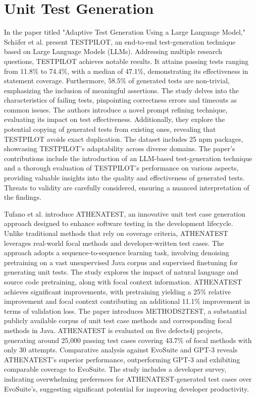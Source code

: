 \section{Unit Test Generation}
\label{sec:soa_unit_test_generation}
\vspace{0.2 cm}

In the paper titled "Adaptive Test Generation Using a Large Language Model," Schäfer et al. present TESTPILOT\cite{schafer_adaptive_2023}, an end-to-end test-generation technique based on Large Language Models (LLMs). Addressing multiple research questions, TESTPILOT achieves notable results. It attains passing tests ranging from 11.8\% to 74.4\%, with a median of 47.1\%, demonstrating its effectiveness in statement coverage. Furthermore, 58.5\% of generated tests are non-trivial, emphasizing the inclusion of meaningful assertions. The study delves into the characteristics of failing tests, pinpointing correctness errors and timeouts as common issues. The authors introduce a novel prompt refining technique, evaluating its impact on test effectiveness. Additionally, they explore the potential copying of generated tests from existing ones, revealing that TESTPILOT avoids exact duplication. The dataset includes 25 npm packages, showcasing TESTPILOT's adaptability across diverse domains. The paper's contributions include the introduction of an LLM-based test-generation technique and a thorough evaluation of TESTPILOT's performance on various aspects, providing valuable insights into the quality and effectiveness of generated tests. Threats to validity are carefully considered, ensuring a nuanced interpretation of the findings.

Tufano et al. introduce ATHENATEST\cite{tufano_unit_2021}, an innovative unit test case generation approach designed to enhance software testing in the development lifecycle. Unlike traditional methods that rely on coverage criteria, ATHENATEST leverages real-world focal methods and developer-written test cases. The approach adopts a sequence-to-sequence learning task, involving denoising pretraining on a vast unsupervised Java corpus and supervised finetuning for generating unit tests. The study explores the impact of natural language and source code pretraining, along with focal context information. ATHENATEST achieves significant improvements, with pretraining yielding a 25\% relative improvement and focal context contributing an additional 11.1\% improvement in terms of validation loss. The paper introduces METHODS2TEST, a substantial publicly available corpus of unit test case methods and corresponding focal methods in Java. ATHENATEST is evaluated on five defects4j projects, generating around 25,000 passing test cases covering 43.7\% of focal methods with only 30 attempts. Comparative analysis against EvoSuite and GPT-3 reveals ATHENATEST's superior performance, outperforming GPT-3 and exhibiting comparable coverage to EvoSuite. The study includes a developer survey, indicating overwhelming preferences for ATHENATEST-generated test cases over EvoSuite's, suggesting significant potential for improving developer productivity.

